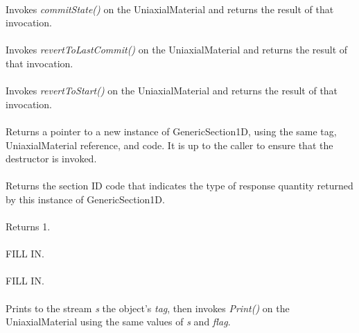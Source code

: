  \\
Invokes {\em commitState()} on the UniaxialMaterial and returns the
result of that invocation. \\

 \\
Invokes {\em revertToLastCommit()} on the UniaxialMaterial and returns the
result of that invocation. \\

 \\
Invokes {\em revertToStart()} on the UniaxialMaterial and returns the
result of that invocation. \\

 \\
Returns a pointer to a new instance of GenericSection1D, using the
same tag, UniaxialMaterial reference, and code. It is up to the caller to
ensure that the destructor is invoked. \\

 \\
Returns the section ID code that indicates the type of response quantity 
returned by this instance of GenericSection1D. \\

 \\
Returns 1. \\

\\
FILL IN. \\

\\
FILL IN. \\

 \\
Prints to the stream {\em s} the object's {\em tag}, then invokes
{\em Print()} on the UniaxialMaterial using the same values of {\em s}
and {\em flag}. \\
